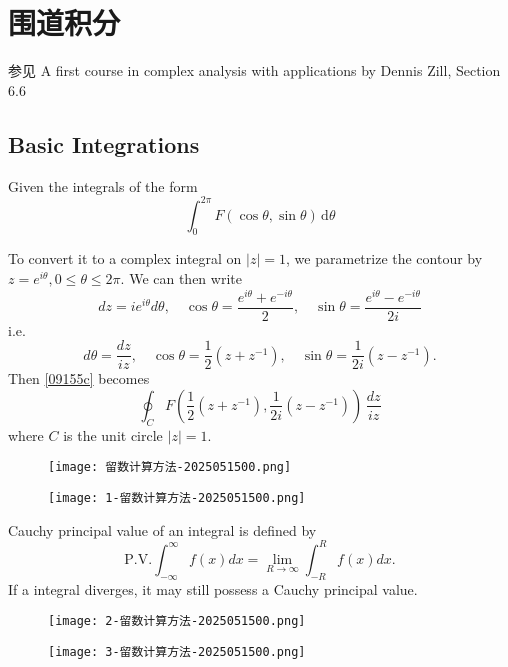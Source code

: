 \section{围道积分}

参见 A first course in complex analysis with applications by Dennis Zill, Section 6.6

\subsection{Basic Integrations}

Given the integrals of the form
\begin{equation}
\int_{0}^{2\pi} F(\cos\theta,\sin\theta) \, \mathrm{d}\theta
\label{09155c}
\end{equation}

To convert it to a complex integral on $\lvert z \rvert=1$, we parametrize the contour by $z=e^{ i\theta },0\leq\theta\leq2\pi$. We can then write
\[
dz=ie^{ i\theta }d\theta,\quad \cos\theta=\frac{e^{ i\theta }+e^{ -i\theta }}{2},\quad \sin\theta=\frac{e^{ i\theta }-e^{ -i\theta }}{2i}
\]
i.e.
\[
d\theta=\frac{dz}{iz},\quad\cos\theta=\frac{1}{2}(z+z^{-1}),\quad\sin\theta=\frac{1}{2i}(z-z^{-1}).
\]
Then \cref{09155c} becomes
\[
\oint_{C}F\left( \frac{1}{2}(z+z^{-1}),\frac{1}{2i}(z-z^{-1}) \right)\,\frac{dz }{iz}
\]
where $C$ is the unit circle $\lvert z \rvert=1$.

\begin{figure}[H]
\centering
\texttt{[image: 留数计算方法-2025051500.png]}
\label{}
\end{figure}
\begin{figure}[H]
\centering
\texttt{[image: 1-留数计算方法-2025051500.png]}
\label{}
\end{figure}

Cauchy principal value of an integral is defined by
\[
\mathrm{P.V.}\int_{-\infty}^{\infty}f(x)dx=\lim_{R\to\infty}\int_{-R}^{R}f(x)dx.
\]
If a integral diverges, it may still possess a Cauchy principal value.

\begin{figure}[H]
\centering
\texttt{[image: 2-留数计算方法-2025051500.png]}
\label{}
\end{figure}

\begin{figure}[H]
\centering
\texttt{[image: 3-留数计算方法-2025051500.png]}
\label{}
\end{figure}


